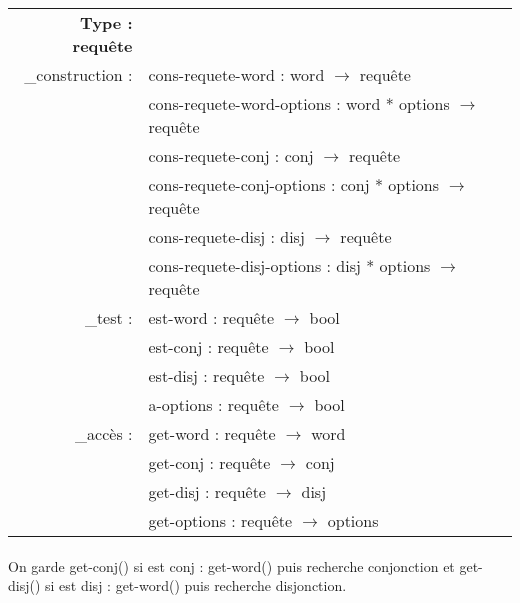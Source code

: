 \begin{tabular}{r l}

\textbf{Type : requête} & \\
_construction :& cons-requete-word : word $\rightarrow$ requête\\
& cons-requete-word-options : word * options $\rightarrow$ requête\\ 
& cons-requete-conj : conj $\rightarrow$ requête\\
& cons-requete-conj-options : conj * options $\rightarrow$ requête\\
& cons-requete-disj : disj $\rightarrow$ requête\\
& cons-requete-disj-options : disj * options $\rightarrow$ requête\\
_test :& est-word : requête $\rightarrow$ bool\\
& est-conj : requête $\rightarrow$ bool\\
& est-disj : requête $\rightarrow$ bool\\
& a-options : requête $\rightarrow$ bool\\
_accès :& get-word : requête $\rightarrow$ word\\
& get-conj : requête $\rightarrow$ conj\\
& get-disj : requête $\rightarrow$ disj\\
& get-options : requête $\rightarrow$ options\\
\end{tabular}

\paragraph{}
On garde get-conj() si est conj : get-word() puis recherche conjonction et
get-disj() si est disj : get-word() puis recherche disjonction.
\paragraph{}


